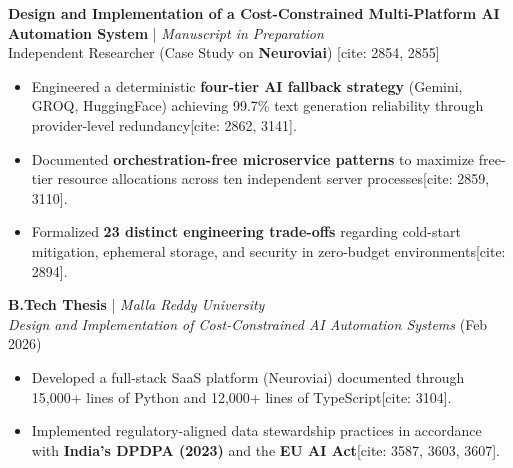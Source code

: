 \documentclass[11pt]{article}
\begin{document}
\textbf{Design and Implementation of a Cost-Constrained Multi-Platform AI Automation System} | \textit{Manuscript in Preparation} \\
Independent Researcher (Case Study on \textbf{Neuroviai}) [cite: 2854, 2855]
\begin{itemize}
    \item Engineered a deterministic \textbf{four-tier AI fallback strategy} (Gemini, GROQ, HuggingFace) achieving 99.7\% text generation reliability through provider-level redundancy[cite: 2862, 3141].
    \item Documented \textbf{orchestration-free microservice patterns} to maximize free-tier resource allocations across ten independent server processes[cite: 2859, 3110].
    \item Formalized \textbf{23 distinct engineering trade-offs} regarding cold-start mitigation, ephemeral storage, and security in zero-budget environments[cite: 2894].
\end{itemize}

\textbf{B.Tech Thesis} | \textit{Malla Reddy University} \\
\textit{Design and Implementation of Cost-Constrained AI Automation Systems} (Feb 2026) 
\begin{itemize}
    \item Developed a full-stack SaaS platform (Neuroviai) documented through 15,000+ lines of Python and 12,000+ lines of TypeScript[cite: 3104].
    \item Implemented regulatory-aligned data stewardship practices in accordance with \textbf{India’s DPDPA (2023)} and the \textbf{EU AI Act}[cite: 3587, 3603, 3607].
\end{itemize}

\end{document}
